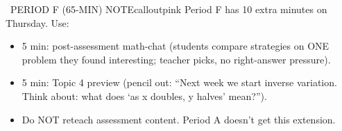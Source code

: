 \documentclass[11pt]{article}
\begin{document}
\clearpage

\begin{callout}{\IconClock\ PERIOD F (65-MIN) NOTE}{calloutpink}
Period F has 10 extra minutes on Thursday. Use:
\begin{itemize}[leftmargin=1.5em,itemsep=2pt,topsep=2pt]
  \item 5 min: post-assessment math-chat (students compare strategies on ONE problem they found interesting; teacher picks, no right-answer pressure).
  \item 5 min: Topic 4 preview (pencil out: ``Next week we start inverse variation. Think about: what does `as x doubles, y halves' mean?'').
  \item Do NOT reteach assessment content. Period A doesn't get this extension.
\end{itemize}
\end{callout}
\end{document}

